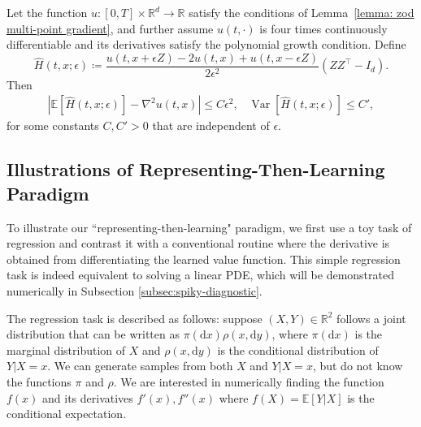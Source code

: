 \documentclass[twoside,11pt]{article}
\newcommand{\dd}{\mathrm{d}}
\newcommand{\E}{\mathbb{E}}
\newcommand{\R}{\mathbb{R}}
\newcommand{\1}{\mathbf{1}}
\DeclareMathOperator{\Var}{Var}
\numberwithin{equation}{section}
\newcommand{\defeq}{\coloneqq}
\begin{document}
\begin{lemma}
\label{lemma: zod multi-point hessian}
Let the function $u: [0,T] \times \R^d \to \R$ satisfy the conditions of Lemma~\ref{lemma: zod multi-point gradient}, and further assume $u(t, \cdot)$ is four times continuously differentiable and its derivatives satisfy the polynomial growth condition. Define
\begin{equation}
\label{eq:symmetric_hessian_estimator}
\hat{H}(t, x; \epsilon) \defeq \frac{u(t, x+\epsilon Z) - 2u(t,x) + u(t, x-\epsilon Z)}{2\epsilon^2} (ZZ^\top - I_d).
\end{equation}
Then
\begin{align}
\left| \E\left[ \hat{H}(t, x; \epsilon) \right] - \nabla^2 u(t,x) \right| \le C \epsilon^2, \;\;\; %
\Var\left[ \hat{H}(t, x; \epsilon) \right] \le C', %
\end{align}
for some constants $C, C' > 0$ that are independent of $\epsilon$.
\end{lemma}

\subsection{Illustrations of Representing-Then-Learning Paradigm}
\label{sec:illustrate toy}

To illustrate our ``representing-then-learning" paradigm, we first %
use a toy task of regression and contrast it with a conventional routine where the derivative is obtained from differentiating the learned value function. This simple regression task is indeed equivalent to solving a linear PDE, which will be demonstrated numerically  in Subsection \ref{subsec:spiky-diagnostic}.

The regression task is described as follows: suppose $(X,Y)\in \mathbb R^2$ follows a joint distribution that can be written as $\pi(\dd x)\rho(x,\dd y)$, where $\pi(\dd x)$ is the marginal distribution of $X$ and $\rho(x,\dd y)$ is the conditional distribution of $Y|X=x$.
We can generate samples from both $X$ and $Y|X=x$, but do not know the functions $\pi$ and $\rho$.
We are interested in numerically finding the function $f(x)$ and its derivatives $f'(x), f''(x)$ %
where $f(X) = \E[Y|X]$ is the conditional expectation.
\end{document}
